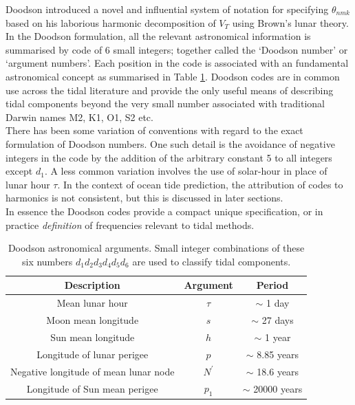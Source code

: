 Doodson \citep{Doodson:1921kt} introduced a novel and influential system of notation for specifying $\theta_{nmk}$ based on his laborious harmonic decomposition of $V_T$ using Brown's lunar theory.  In the Doodson formulation, all the relevant astronomical information is summarised by code of 6 small integers; together called the `Doodson number' or `argument numbers'.   Each position in the code is associated with an fundamental astronomical concept as summarised in Table \ref{T:doodson}.  Doodson codes are in common use across the tidal literature and provide the only useful means of describing tidal components beyond the very small number associated with traditional Darwin names M2, K1, O1, S2 etc.\\
There has been some variation of conventions with regard to the exact formulation of Doodson numbers.  One such detail is the avoidance of negative integers in the code by the addition of the arbitrary constant 5 to all integers except $d_1$.   A less common variation involves the use of solar-hour in place of lunar hour $\tau$.  In the context of ocean tide prediction, the attribution of codes to harmonics is not consistent, but this is discussed in later sections. \\
In essence the Doodson codes provide a compact unique specification, or in practice \emph{definition} of frequencies relevant to tidal methods.


\begin{table}[htp]
\caption{Doodson astronomical arguments.  Small integer combinations of these six numbers $d_1 d_2 d_3 d_4 d_5 d_6$ are used to classify tidal components.}
\begin{center} 
\begin{tabular}{|c|c|c|}
\hline
Description                            & Argument          & Period\\
\hline
Mean lunar hour                        & $\tau$            & $\sim$ 1 day      \\
Moon mean longitude                    & $s$               & $\sim$ 27 days    \\  
Sun mean longitude                     & $h$               & $\sim$ 1 year     \\
Longitude of lunar perigee             & $p$               & $\sim$ 8.85 years \\
Negative longitude of mean lunar node  & $N^\prime$        & $\sim$ 18.6 years \\
Longitude of Sun mean perigee          & $p_1$             & $\sim$ 20000 years\\
\hline
\end{tabular} 
\end{center}
\label{T:doodson}
\end{table}


